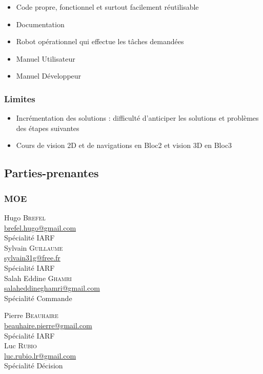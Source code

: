 \documentclass[10pt,a4paper]{article}
\begin{document}
\begin{itemize}
\renewcommand{\labelitemi}{$\square$}
\item Code propre, fonctionnel et surtout facilement réutilisable 
\item Documentation
\item Robot opérationnel qui effectue les tâches demandées
\item Manuel Utilisateur
\item Manuel Développeur
\end{itemize} 

\subsubsection{Limites}
\begin{itemize}
\item Incrémentation des solutions : difficulté d'anticiper les solutions et problèmes des étapes suivantes
\item Cours de vision 2D et de navigations en Bloc2 et vision 3D en Bloc3
\end{itemize} 

\subsection{Parties-prenantes}

\subsubsection{MOE} 
\begin{minipage}[t]{0.30 \textwidth} 
Hugo \textsc{Brefel} \\
\href{mailto:brefel.hugo@gmail.com}{brefel.hugo@gmail.com} \\
Spécialité IARF \\[0.3cm]
Sylvain \textsc{Guillaume} \\
\href{mailto:sylvain31g@free.fr}{sylvain31g@free.fr} \\
Spécialité IARF \\[0.3cm]
Salah Eddine \textsc{Ghamri} \\
\href{mailto:beauhaire.pierre@gmail.com}{salaheddineghamri@gmail.com} \\
Spécialité Commande
\end{minipage} 
\hfill
\begin{minipage}[t]{0.46\textwidth} 
Pierre \textsc{Beauhaire} \\
\href{mailto:beauhaire.pierre@gmail.com}{beauhaire.pierre@gmail.com} \\
Spécialité IARF \\[0.3cm]
Luc \textsc{Rubio} \\
\href{mailto:luc.rubio.lr@gmail.com}{luc.rubio.lr@gmail.com}   \\
Spécialité Décision
\end{minipage} 
\end{document}
